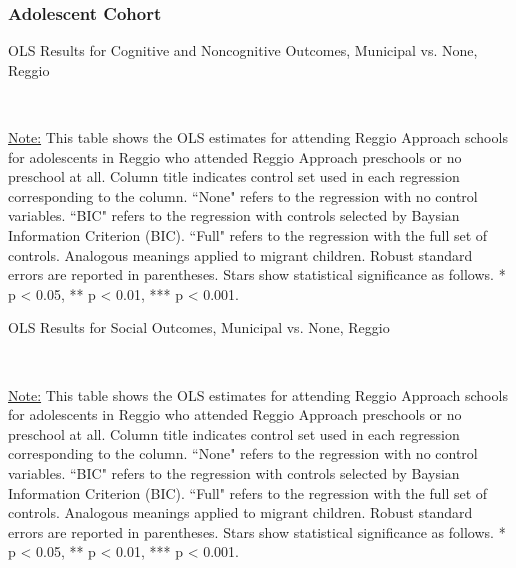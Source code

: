 \subsubsection{Adolescent Cohort}
\begin{table}[H] \caption{OLS Results for Cognitive and Noncognitive Outcomes, Municipal vs. None, Reggio} \label{ols-CN-adol-reg}
\scalebox{0.85}{
}
\vspace{1ex} \\
\footnotesize\raggedright{\underline{Note:} This table shows the OLS estimates for attending Reggio Approach schools for adolescents in Reggio who attended Reggio Approach preschools or no preschool at all. Column title indicates control set used in each regression corresponding to the column. ``None" refers to the regression with no control variables. ``BIC" refers to the regression with controls selected by Baysian Information Criterion (BIC). ``Full" refers to the regression with the full set of controls. Analogous meanings applied to migrant children. Robust standard errors are reported in parentheses. Stars show statistical significance as follows. * p < 0.05, ** p < 0.01, *** p < 0.001.}
\end{table}

\begin{table}[H] \caption{OLS Results for Social Outcomes, Municipal vs. None, Reggio} \label{ols-S-adol-reg}

\vspace{1ex} \\
\footnotesize\raggedright{\underline{Note:} This table shows the OLS estimates for attending Reggio Approach schools for adolescents in Reggio who attended Reggio Approach preschools or no preschool at all. Column title indicates control set used in each regression corresponding to the column. ``None" refers to the regression with no control variables. ``BIC" refers to the regression with controls selected by Baysian Information Criterion (BIC). ``Full" refers to the regression with the full set of controls. Analogous meanings applied to migrant children. Robust standard errors are reported in parentheses. Stars show statistical significance as follows. * p < 0.05, ** p < 0.01, *** p < 0.001.}
\end{table}

